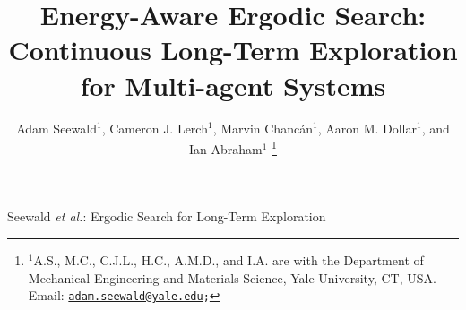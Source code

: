 \documentclass[lettersize,journal,twoside]{IEEEtran}
\theoremstyle{definition}
\begin{document}

\title{Energy-Aware Ergodic Search: Continuous Long-Term Exploration for Multi-agent Systems}

\author{Adam Seewald${}^\text{1}$, Cameron J. Lerch${}^\text{1}$, Marvin Chanc{\'a}n${}^\text{1}$, %
Aaron M. Dollar${}^\text{1}$, and Ian Abraham${}^\text{1}$%
  \thanks{${}^\text{1}$A.\hspace*{.4ex}S., M.\hspace*{.4ex}C., C.\hspace*{.4ex}J.\hspace*{.4ex}L., H.\hspace*{.4ex}C., A.\hspace*{.4ex}M.\hspace*{.4ex}D., and I.\hspace*{.4ex}A. are with the Department of Mechanical Engineering and Materials Science, Yale University, CT, USA. Email: {\tt\footnotesize \href{mailto:adam.seewald@yale.edu}{adam.seewald@yale.edu};}}
}

%
{Seewald \MakeLowercase{\textit{et al.}}: Ergodic Search for Long-Term Exploration}
\end{document}
